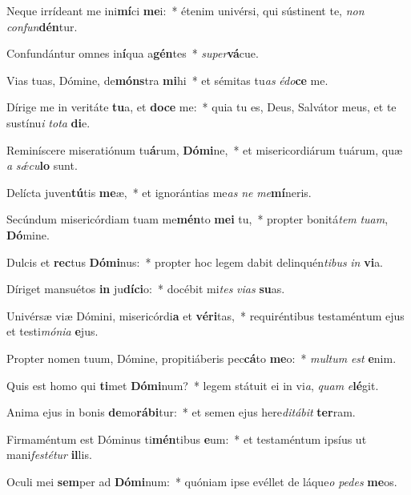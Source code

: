 \item Neque irrídeant me ini\textbf{mí}ci \textbf{me}i:~* étenim univérsi, qui sústinent te, \textit{non} \textit{con}\textit{fun}\textbf{dén}tur.
\item Confundántur omnes in\textbf{í}qua a\textbf{gén}tes~* \textit{su}\textit{per}\textbf{vá}cue.
\item Vias tuas, Dómine, de\textbf{móns}tra \textbf{mi}hi~* et sémitas tu\textit{as} \textit{é}\textit{do}\textbf{ce} me.
\item Dírige me in veritáte \textbf{tu}a, et \textbf{do}\textbf{ce} me:~* quia tu es, Deus, Salvátor meus, et te sustínu\textit{i} \textit{to}\textit{ta} \textbf{di}e.
\item Reminíscere miseratiónum tu\textbf{á}rum, \textbf{Dó}\textbf{mi}ne,~* et misericordiárum tuárum, quæ \textit{a} \textit{sǽ}\textit{cu}\textbf{lo} sunt.
\item Delícta juven\textbf{tú}tis \textbf{me}æ,~* et ignorántias me\textit{as} \textit{ne} \textit{me}\textbf{mí}neris.
\item Secúndum misericórdiam tuam me\textbf{mén}to \textbf{me}\textbf{i} tu,~* propter bonitá\textit{tem} \textit{tu}\textit{am}, \textbf{Dó}mine.
\item Dulcis et \textbf{rec}tus \textbf{Dó}\textbf{mi}nus:~* propter hoc legem dabit delinquén\textit{ti}\textit{bus} \textit{in} \textbf{vi}a.
\item Díriget mansuétos \textbf{in} ju\textbf{dí}\textbf{ci}o:~* docébit mi\textit{tes} \textit{vi}\textit{as} \textbf{su}as.
\item Univérsæ viæ Dómini, misericórdi\textbf{a} et \textbf{vé}\textbf{ri}tas,~* requiréntibus testaméntum ejus et testi\textit{mó}\textit{ni}\textit{a} \textbf{e}jus.
\item Propter nomen tuum, Dómine, propitiáberis pec\textbf{cá}to \textbf{me}o:~* \textit{mul}\textit{tum} \textit{est} \textbf{e}nim.
\item Quis est homo qui \textbf{ti}met \textbf{Dó}\textbf{mi}num?~* legem státuit ei in vi\textit{a}, \textit{quam} \textit{e}\textbf{lé}git.
\item Anima ejus in bonis \textbf{de}mo\textbf{rá}\textbf{bi}tur:~* et semen ejus here\textit{di}\textit{tá}\textit{bit} \textbf{ter}ram.
\item Firmaméntum est Dóminus ti\textbf{mén}tibus \textbf{e}um:~* et testaméntum ipsíus ut mani\textit{fes}\textit{té}\textit{tur} \textbf{il}lis.
\item Oculi mei \textbf{sem}per ad \textbf{Dó}\textbf{mi}num:~* quóniam ipse evéllet de láque\textit{o} \textit{pe}\textit{des} \textbf{me}os.
